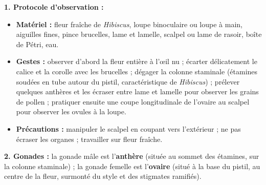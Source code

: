 \documentclass[11pt]{article}
\newcommand{\cle}[1]{{\popxbold\color{popdark}#1}}
\begin{document}
\begin{corrige}
\textbf{1. Protocole d'observation :}
\begin{itemize}
\item \textbf{Matériel :} fleur fraîche de \emph{Hibiscus}, loupe binoculaire ou loupe à main, aiguilles fines, pince brucelles, lame et lamelle, scalpel ou lame de rasoir, boîte de Pétri, eau.
\item \textbf{Gestes :} observer d'abord la fleur entière à l'\oe il nu ; écarter délicatement le calice et la corolle avec les brucelles ; dégager la colonne staminale (étamines soudées en tube autour du pistil, caractéristique de \emph{Hibiscus}) ; prélever quelques anthères et les écraser entre lame et lamelle pour observer les grains de pollen ; pratiquer ensuite une coupe longitudinale de l'ovaire au scalpel pour observer les ovules à la loupe.
\item \textbf{Précautions :} manipuler le scalpel en coupant vers l'extérieur ; ne pas écraser les organes ; travailler sur fleur fraîche.
\end{itemize}

\textbf{2. Gonades :} la \cle{gonade mâle} est l'\textbf{anthère} (située au sommet des étamines, sur la colonne staminale) ; la \cle{gonade femelle} est l'\textbf{ovaire} (situé à la base du pistil, au centre de la fleur, surmonté du style et des stigmates ramifiés).


\end{corrige}
\end{document}
